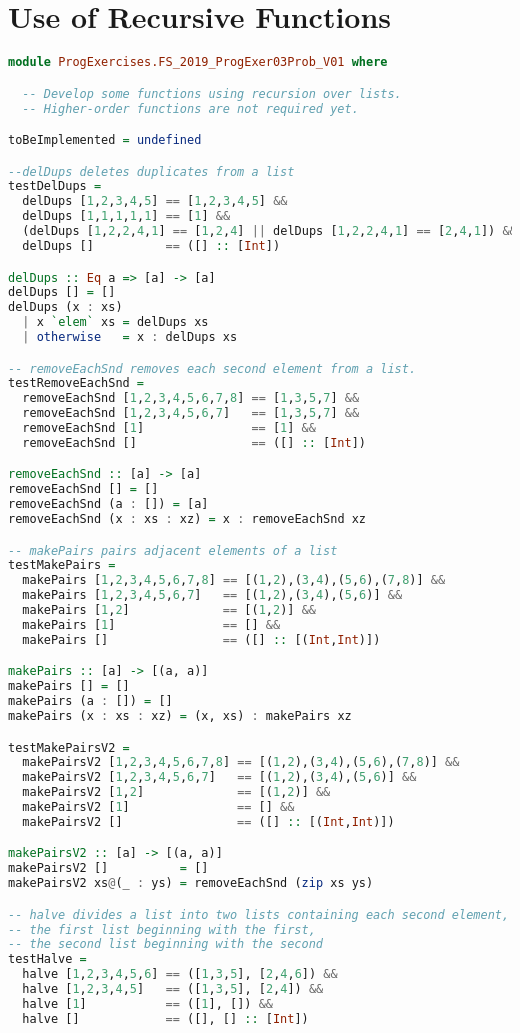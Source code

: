 \section{Use of Recursive Functions}

\begin{lstlisting}[language=Haskell]
module ProgExercises.FS_2019_ProgExer03Prob_V01 where

  -- Develop some functions using recursion over lists.
  -- Higher-order functions are not required yet.

toBeImplemented = undefined

--delDups deletes duplicates from a list
testDelDups =
  delDups [1,2,3,4,5] == [1,2,3,4,5] &&
  delDups [1,1,1,1,1] == [1] &&
  (delDups [1,2,2,4,1] == [1,2,4] || delDups [1,2,2,4,1] == [2,4,1]) &&
  delDups []          == ([] :: [Int])

delDups :: Eq a => [a] -> [a]
delDups [] = []
delDups (x : xs)
  | x `elem` xs = delDups xs
  | otherwise   = x : delDups xs

-- removeEachSnd removes each second element from a list.
testRemoveEachSnd =
  removeEachSnd [1,2,3,4,5,6,7,8] == [1,3,5,7] &&
  removeEachSnd [1,2,3,4,5,6,7]   == [1,3,5,7] &&
  removeEachSnd [1]               == [1] &&
  removeEachSnd []                == ([] :: [Int])

removeEachSnd :: [a] -> [a]
removeEachSnd [] = []
removeEachSnd (a : []) = [a]
removeEachSnd (x : xs : xz) = x : removeEachSnd xz

-- makePairs pairs adjacent elements of a list
testMakePairs =
  makePairs [1,2,3,4,5,6,7,8] == [(1,2),(3,4),(5,6),(7,8)] &&
  makePairs [1,2,3,4,5,6,7]   == [(1,2),(3,4),(5,6)] &&
  makePairs [1,2]             == [(1,2)] &&
  makePairs [1]               == [] &&
  makePairs []                == ([] :: [(Int,Int)])

makePairs :: [a] -> [(a, a)]
makePairs [] = []
makePairs (a : []) = []
makePairs (x : xs : xz) = (x, xs) : makePairs xz

testMakePairsV2 =
  makePairsV2 [1,2,3,4,5,6,7,8] == [(1,2),(3,4),(5,6),(7,8)] &&
  makePairsV2 [1,2,3,4,5,6,7]   == [(1,2),(3,4),(5,6)] &&
  makePairsV2 [1,2]             == [(1,2)] &&
  makePairsV2 [1]               == [] &&
  makePairsV2 []                == ([] :: [(Int,Int)])

makePairsV2 :: [a] -> [(a, a)]
makePairsV2 []          = []
makePairsV2 xs@(_ : ys) = removeEachSnd (zip xs ys)

-- halve divides a list into two lists containing each second element,
-- the first list beginning with the first,
-- the second list beginning with the second
testHalve =
  halve [1,2,3,4,5,6] == ([1,3,5], [2,4,6]) &&
  halve [1,2,3,4,5]   == ([1,3,5], [2,4]) &&
  halve [1]           == ([1], []) &&
  halve []            == ([], [] :: [Int])





\end{lstlisting}
